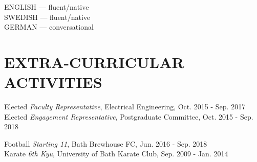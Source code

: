 \documentclass[margin, 10pt]{res} %
\begin{document}
\begin{resume}
ENGLISH --- fluent/native\\
SWEDISH --- fluent/native\\
GERMAN --- conversational


\section{EXTRA-CURRICULAR \\ ACTIVITIES} 

Elected {\it Faculty Representative}, Electrical Engineering, Oct. 2015 - Sep. 2017 \\
Elected {\it Engagement Representative}, Postgraduate Committee, Oct. 2015 - Sep. 2018 \\
\vspace{-0.5cm}

Football {\it Starting 11}, Bath Brewhouse FC, Jun. 2016 - Sep. 2018 \\
Karate {\it 6th Kyu}, University of Bath Karate Club, Sep. 2009 - Jan. 2014


\end{resume}
\end{document}
